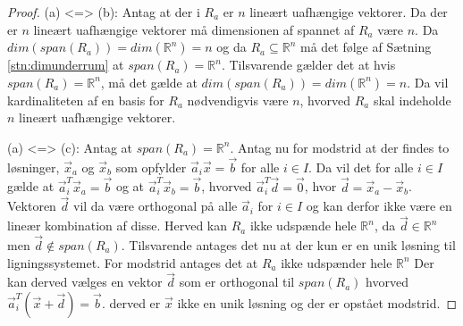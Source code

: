 \begin{proof}
	(a) <=> (b): Antag at der i $R_a$ er $n$ lineært uafhængige vektorer. Da der er $n$ lineært uafhængige vektorer må dimensionen af spannet af $R_a$ være $n$. Da $dim(span(R_a))=dim(\mathds{R}^n)=n$ og da $R_a \subseteq \mathds{R}^n$ må det følge af Sætning \ref{stn:dimunderrum} at $span(R_a)=\mathds{R}^n$. Tilsvarende gælder det at hvis $span(R_a)=\mathds{R}^n$, må det gælde at $dim(span(R_a))=dim(\mathds{R}^n)=n$. Da vil kardinaliteten af en basis for $R_a$ nødvendigvis være $n$, hvorved $R_a$ skal indeholde $n$ lineært uafhængige vektorer.


(a) <=> (c): Antag at $span(R_a)=\mathds{R}^n$. Antag nu for modstrid at der findes to løsninger, $\vec{x}_a$ og $\vec{x}_b$ som opfylder $\vec{a}_i\vec{x}=\vec{b}$ for alle $i \in I$. 
Da vil det for alle $i \in I$ gælde at $\vec{a}_i^T\vec{x}_a=\vec{b}$ og at $\vec{a}_i^T\vec{x}_b=\vec{b}$, hvorved $\vec{a}_i^T\vec{d}=\vec{0}$, hvor $\vec{d}=\vec{x}_a-\vec{x}_b$. 
Vektoren $\vec{d}$ vil da være orthogonal på alle $\vec{a}_i$ for $i \in I$ og kan derfor ikke være en lineær kombination af disse. Herved kan $R_a$ ikke udspænde hele $\mathds{R}^n$, da $\vec{d} \in \mathds{R}^n$ men $\vec{d} \notin span(R_a)$.
Tilsvarende antages det nu at der kun er en unik løsning til ligningssystemet. For modstrid antages det at $R_a$ ikke udspænder hele $\mathds{R}^n$ Der kan derved vælges en vektor $\vec{d}$ som er orthogonal til $span(R_a)$ hvorved $\vec{a}_i^T(\vec{x}+\vec{d})=\vec{b}$. derved er $\vec{x}$ ikke en unik løsning og der er opstået modstrid.
\end{proof}
	
	
	



